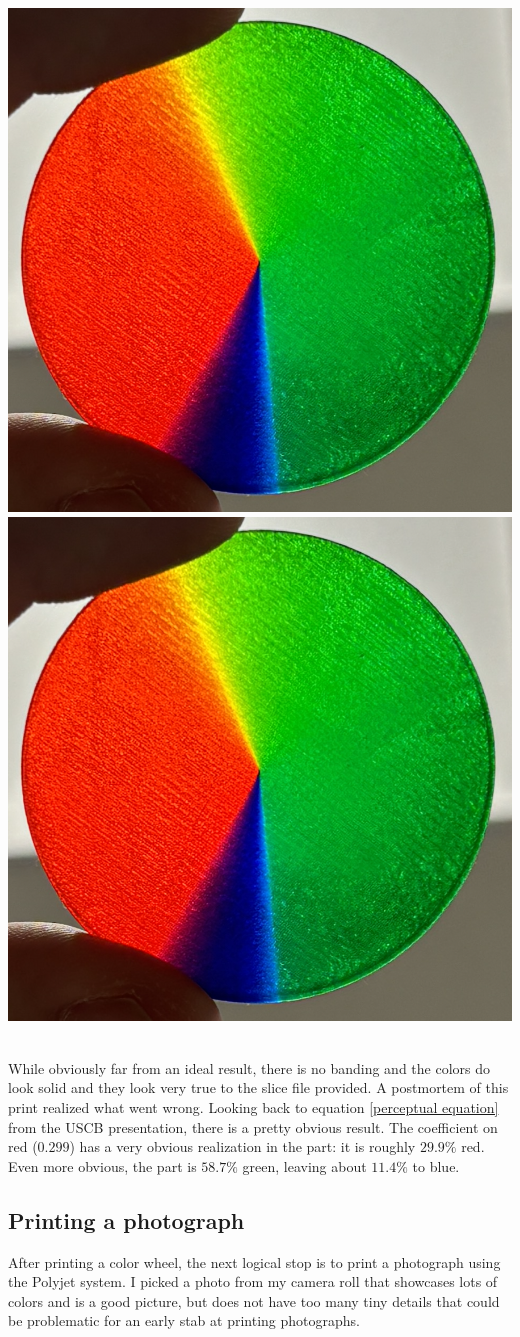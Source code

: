 \documentclass{article}
\begin{document}
\begin{multicols}{2}
\noindent
\includegraphics[width=0.5\columnwidth]{perceptual-result-light}
\includegraphics[width=0.5\columnwidth]{perceptual-result-light}
\

\noindent
While obviously far from an ideal result, there is no banding and the colors do look solid and they look very true to the slice file provided. A postmortem of this print realized what went wrong. Looking back to equation \ref{perceptual equation} from the USCB presentation, there is a pretty obvious result. The coefficient on red ($0.299$) has a very obvious realization in the part: it is roughly $29.9\%$ red. Even more obvious, the part is $58.7\%$ green, leaving about $11.4\%$ to blue.

\subsection{Printing a photograph}

After printing a color wheel, the next logical stop is to print a photograph using the Polyjet system. I picked a photo from my camera roll that showcases lots of colors and is a good picture, but does not have too many tiny details that could be problematic for an early stab at printing photographs.
\\


\end{multicols}
\end{document}
